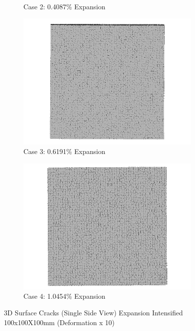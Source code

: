 \begin{figure}[ht!]
\begin{subfigure}{.5\textwidth}
    \caption{Case 2: 0.4087\% Expansion}
    \end{subfigure}%
    \begin{subfigure}{.5\textwidth}
      \centering
      \includegraphics[width=.8\linewidth]{Files/exp_3D/DEF/A30X-1C_3_3ds.png}
    \caption{Case 3: 0.6191\% Expansion}
    \end{subfigure}
    \begin{subfigure}{.5\textwidth}
      \centering
      \includegraphics[width=.8\linewidth]{Files/exp_3D/DEF/A30X-1C_4_3ds.png}
    \caption{Case 4: 1.0454\% Expansion}
    \end{subfigure}%

  \caption{3D Surface Cracks (Single Side View) Expansion Intensified 100x100X100mm (Deformation x 10)}
  \label{fig:ASR_A30X-1C_3DS}
\end{figure}

